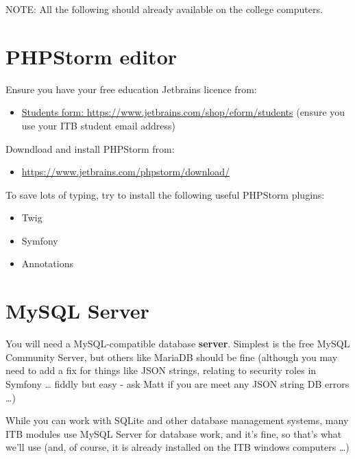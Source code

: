 \documentclass[a4paperpaper,openright]{book}
\providecommand{\tightlist}{%
  \setlength{\itemsep}{0pt}\setlength{\parskip}{0pt}}
\begin{document}
NOTE: All the following should already available on the college
computers.

\hypertarget{phpstorm-editor}{%
\section{PHPStorm editor}\label{phpstorm-editor}}

Ensure you have your free education Jetbrains licence from:

\begin{itemize}
\tightlist
\item
  \href{https://www.jetbrains.com/shop/eform/students}{Students form:
  https://www.jetbrains.com/shop/eform/students} (ensure you use your
  ITB student email address)
\end{itemize}

Downdload and install PHPStorm from:

\begin{itemize}
\tightlist
\item
  \url{https://www.jetbrains.com/phpstorm/download/}
\end{itemize}

To save lots of typing, try to install the following useful PHPStorm
plugins:

\begin{itemize}
\tightlist
\item
  Twig
\item
  Symfony
\item
  Annotations
\end{itemize}

\hypertarget{mysql-server}{%
\section{MySQL Server}\label{mysql-server}}

You will need a MySQL-compatible database \textbf{server}. Simplest is
the free MySQL Community Server, but others like MariaDB should be fine
(although you may need to add a fix for things like JSON strings,
relating to security roles in Symfony \ldots{} fiddly but easy - ask
Matt if you are meet any JSON string DB errors \ldots{})

While you can work with SQLite and other database management systems,
many ITB modules use MySQL Server for database work, and it's fine, so
that's what we'll use (and, of course, it is already installed on the
ITB windows computers \ldots{})
\end{document}

